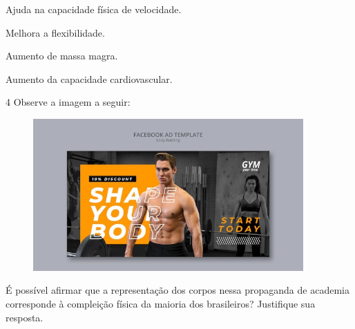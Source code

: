 \begin{boxlist}
 Ajuda na capacidade física de velocidade.

 Melhora a flexibilidade.

 Aumento de massa magra.

 Aumento da capacidade cardiovascular.
\end{boxlist}


\num{4}  Observe a imagem a seguir:

\begin{figure}[htpb!]
\includegraphics[width=4.07407in,height=2.28999in]{./imgs/img4.jpg}
\end{figure}

É possível afirmar que a representação dos corpos nessa propaganda de 
academia corresponde à compleição física da maioria dos brasileiros?
Justifique sua resposta.



